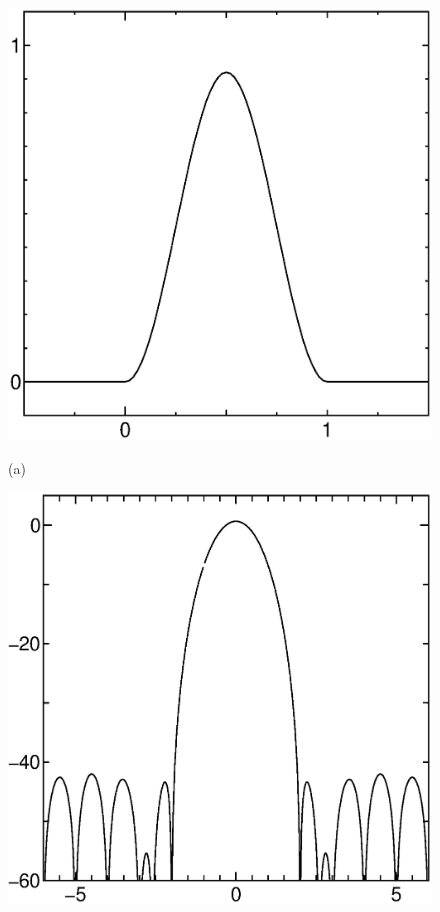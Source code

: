 \begin{figure}[H]
\begin{center}
\begin{minipage}{.38\textwidth}
\begin{center}
\includegraphics[width=.98\textwidth]{fig/humming-mado-a.eps}

(a)
\end{center}
\end{minipage}
\begin{minipage}{.38\textwidth}
\begin{center}
\includegraphics[width=.98\textwidth]{fig/humming-mado-b.eps}


\end{center}
\end{minipage}
\end{center}
\end{figure}
